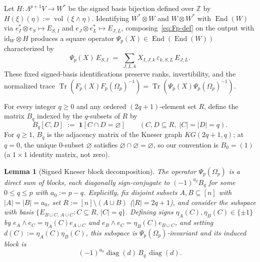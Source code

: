 \documentclass[11pt,reqno]{amsart}
\newtheorem{lemma}[theorem]{Lemma}
\theoremstyle{definition}
\theoremstyle{remark}
\numberwithin{equation}{section}
\newcommand{\ZZ}{\mathbb{Z}}
\DeclareMathOperator{\End}{End}
\DeclareMathOperator{\Tr}{Tr}
\DeclareMathOperator{\diag}{diag}
\DeclareMathOperator{\vol}{vol}
\begin{document}
Let $H : \Lambda^{p+1} V \to W^*$ be the signed basis bijection defined over $\ZZ$ by $H(\xi)(\eta) := \vol(\xi \wedge \eta)$. Identifying $W^* \otimes W$ and $W \otimes W^*$ with $\End(W)$ via $e_I^* \otimes e_S \mapsto E_{S,I}$ and $e_J \otimes e_L^* \mapsto E_{J,L}$, composing~\eqref{eq:Fp-def} on the output with $\mathrm{id}_W \otimes H$ produces a square operator $\Psi_p(X) \in \End(\End(W))$ characterized by
\begin{equation}\label{eq:Psip-def}
  \Psi_p(X)\, E_{S,I} \;=\; \sum_{J, L, k} X_{I,J,k}\, \varepsilon_{k,S,L}\, E_{J,L}.
\end{equation}
These fixed signed-basis identifications preserve ranks, invertibility, and the normalized trace $\Tr(F_p(X) F_p(\Omega_p)^{-1}) = \Tr(\Psi_p(X) \Psi_p(\Omega_p)^{-1})$.

For every integer $q \ge 0$ and any ordered $(2q + 1)$-element set $R$, define the matrix $B_q$ indexed by the $q$-subsets of $R$ by
\[
  B_q[C, D] \;:=\; \mathbf{1}[C \cap D = \varnothing] \qquad (C, D \subseteq R,\; |C| = |D| = q).
\]
For $q \ge 1$, $B_q$ is the adjacency matrix of the Kneser graph $KG(2q + 1, q)$; at $q = 0$, the unique $0$-subset $\varnothing$ satisfies $\varnothing \cap \varnothing = \varnothing$, so our convention is $B_0 = (1)$ (a $1 \times 1$ identity matrix, not zero).

\begin{lemma}[Signed Kneser block decomposition]\label{lem:signed-kneser-blocks}
The operator $\Psi_p(\Omega_p)$ is a direct sum of blocks, each diagonally sign-conjugate to $(-1)^{a_0} B_q$ for some $0 \le q \le p$ with $a_0 := p - q$. Explicitly, fix disjoint subsets $A, B \subseteq [n]$ with $|A| = |B| = a_0$, set $R := [n] \setminus (A \cup B)$ ($|R| = 2q + 1$), and consider the subspace with basis $\{E_{B \cup C,\, A \cup C} : C \subseteq R,\, |C| = q\}$. Defining signs $\eta_A(C), \eta_B(C) \in \{\pm 1\}$ by $e_A \wedge e_C = \eta_A(C) e_{A \cup C}$ and $e_B \wedge e_C = \eta_B(C) e_{B \cup C}$, and setting $d(C) := \eta_A(C)\eta_B(C)$, this subspace is $\Psi_p(\Omega_p)$-invariant and its induced block is
\begin{equation}\label{eq:kneser-block}
  (-1)^{a_0} \diag(d)\, B_q\, \diag(d).
\end{equation}
\end{lemma}
\end{document}
